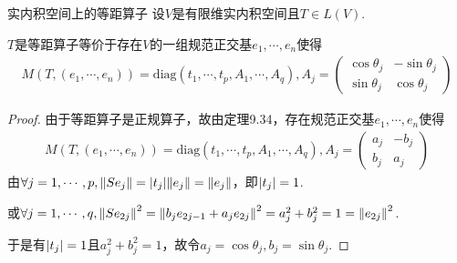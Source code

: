 \begin{theorem}[9.35]\label{thm 9.35} 实内积空间上的等距算子 \:
    设\(V\)是有限维实内积空间且\(T \in L(V)\).

    \(T\)是等距算子等价于存在\(V\)的一组规范正交基\(e_1,\cdots,e_n\)使得
    \begin{align*}
        M(T,(e_1,\cdots,e_n))=\mathrm{diag}(t_1,\cdots,t_p,A_1,\cdots,A_q),A_j=
        \begin{pmatrix}
            \cos \theta_j & -\sin \theta_j \\
            \sin \theta_j & \cos \theta_j
        \end{pmatrix}
    \end{align*}
\end{theorem}

\begin{proof}
    由于等距算子是正规算子，故由定理9.34，存在规范正交基\(e_1,\cdots,e_n\)使得
    \begin{align*}
        M(T,(e_1,\cdots,e_n))=\mathrm{diag}(t_1,\cdots,t_p,A_1,\cdots,A_q),A_j=
        \begin{pmatrix}
            a_j & -b_j \\
            b_j & a_j
        \end{pmatrix}
    \end{align*}
    由\(\forall j=1,\cdots,p,\norm*{Se_j}=\abs*{t_j}\norm*{e_j}=\norm*{e_j}\)，即\(\abs*{t_j}=1\).

    或\(\forall j=1,\cdots,q,\norm*{Se_{2j}}^2=\norm*{b_je_{2j-1}+a_je_{2j}}^2=a_j^2+b_j^2=1=\norm*{e_{2j}}^2\).

    于是有\(\abs*{t_j}=1\)且\(a_j^2+b_j^2=1\)，故令\(a_j=\cos \theta_j,b_j=\sin \theta_j\).
\end{proof}

